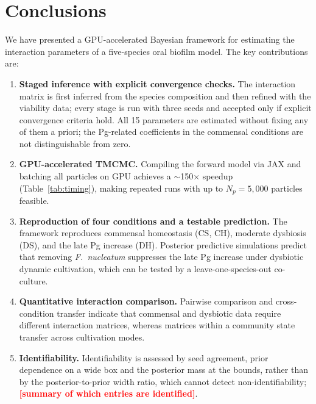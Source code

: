 \documentclass[11pt,a4paper]{article}
\newcommand{\TBD}[1]{\textcolor{red}{\textbf{[#1]}}}
\begin{document}
\section{Conclusions}
\label{sec:conclusions}

We have presented a GPU-accelerated Bayesian framework for estimating the interaction parameters of a five-species oral biofilm model.
The key contributions are:

\begin{enumerate}[nosep,leftmargin=*]
\item \textbf{Staged inference with explicit convergence checks.}
The interaction matrix is first inferred from the species composition and then refined with the viability data; every stage is run with three seeds and accepted only if explicit convergence criteria hold.
All 15 parameters are estimated without fixing any of them a priori; the Pg-related coefficients in the commensal conditions are not distinguishable from zero.

\item \textbf{GPU-accelerated TMCMC.}
Compiling the forward model via JAX and batching all particles on GPU achieves a $\sim$150$\times$ speedup (Table~\ref{tab:timing}), making repeated runs with up to $N_p=5{,}000$ particles feasible.

\item \textbf{Reproduction of four conditions and a testable prediction.}
The framework reproduces commensal homeostasis (CS, CH), moderate dysbiosis (DS), and the late Pg increase (DH).
Posterior predictive simulations predict that removing \textit{F.~nucleatum} suppresses the late Pg increase under dysbiotic dynamic cultivation, which can be tested by a leave-one-species-out co-culture.

\item \textbf{Quantitative interaction comparison.}
Pairwise comparison and cross-condition transfer indicate that commensal and dysbiotic data require different interaction matrices, whereas matrices within a community state transfer across cultivation modes.

\item \textbf{Identifiability.}
Identifiability is assessed by seed agreement, prior dependence on a wide box and the posterior mass at the bounds, rather than by the posterior-to-prior width ratio, which cannot detect non-identifiability; \TBD{summary of which entries are identified}.
\end{enumerate}
\end{document}
